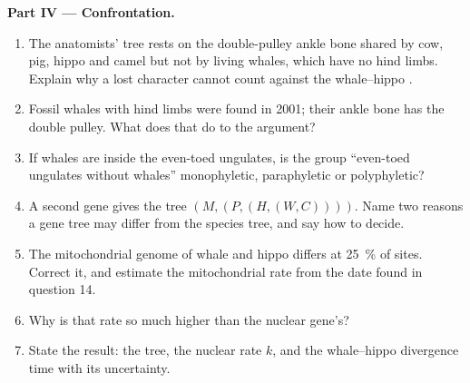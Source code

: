 \begin{problem}
\medskip
\noindent\textbf{Part IV --- Confrontation.}
\begin{enumerate}[resume]
  \item The anatomists' tree rests on the double-pulley ankle bone
        shared by cow, pig, hippo and camel but not by living
        whales, which have no hind limbs. Explain why a lost
        character cannot count against the whale--hippo .
  \item Fossil whales with hind limbs were found in 2001; their
        ankle bone has the double pulley. What does that do to the
        argument?
  \item If whales are inside the even-toed ungulates, is the group
        ``even-toed ungulates without whales'' monophyletic,
        paraphyletic or polyphyletic?
  \item A second gene gives the tree $(M,(P,(H,(W,C))))$. Name two
        reasons a gene tree may differ from the species tree, and
        say how to decide.
  \item The mitochondrial genome of whale and hippo differs at
        \qty{25}{\%} of sites. Correct it, and estimate the
        mitochondrial rate from the date found in question 14.
  \item Why is that rate so much higher than the nuclear gene's?
  \item State the result: the tree, the nuclear rate $k$, and the
        whale--hippo divergence time with its uncertainty.
\end{enumerate}
\end{problem}
